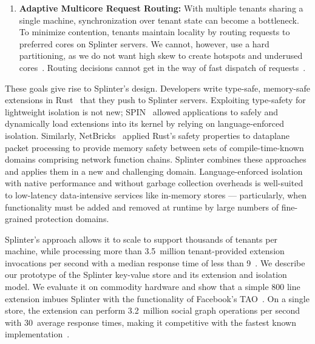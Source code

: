 \begin{enumerate}
\item {\bf Adaptive Multicore Request Routing:}
  With multiple tenants sharing a single machine, synchronization over tenant
    state can become a bottleneck.
  To minimize contention, tenants maintain locality by routing requests to
    preferred cores on Splinter servers.
  We cannot, however, use a hard partitioning, as we do not want high skew to
    create hotspots and underused cores~\cite{zygos}.
    Routing decisions cannot get in the way of fast dispatch of requests~\cite{ix}.

\end{enumerate}

These goals give rise to Splinter's design.
Developers write type-safe, memory-safe extensions in Rust~\cite{rust}
that they push to Splinter servers.
Exploiting type-safety for lightweight isolation is not new;
SPIN~\cite{spin} allowed applications to safely and dynamically load
extensions into its kernel by relying on language-enforced isolation.
Similarly, NetBricks~\cite{netbricks-2016} applied Rust's safety
properties to dataplane packet processing to
  provide memory safety between sets of compile-time-known domains comprising
  network function chains.
Splinter combines these approaches and applies them in a new and challenging domain.
Language-enforced isolation with native performance and without garbage
  collection overheads is well-suited to low-latency data-intensive services
  like in-memory stores --- particularly, when functionality must be added and removed at
  runtime by large numbers of fine-grained protection domains.

Splinter's approach allows it to scale to support thousands of tenants per
  machine, while processing more than
  3.5~million tenant-provided extension invocations per second with a median
  response time of less than 9~\us.
We describe our prototype of the Splinter key-value store and its
  extension and isolation model.
We evaluate it on commodity hardware and show that a simple 800
  line extension imbues Splinter with the functionality of Facebook's
  TAO~\cite{tao-2013}.
On a single store, the extension can perform 3.2~million social graph
  operations per second with 30~\us average response times, making it
  competitive with the fastest known implementation~\cite{farm-2014}.


